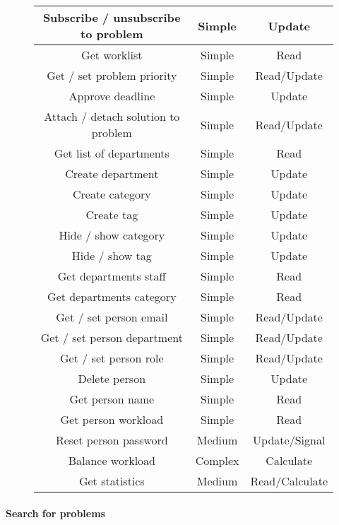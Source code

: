 \begin{figure}[hpt]
\begin{center}
\begin{tabular}{|c|c|c|}
Subscribe / unsubscribe  to problem 	&   Simple & Update   \\ \hline%
Get worklist 								&   Simple & Read   \\ \hline%
Get / set problem priority 	&   Simple & Read/Update   \\ \hline%
Approve deadline 						&   Simple & Update   \\ \hline%
Attach / detach solution to problem	&   Simple & Read/Update   \\ \hline%
Get list of departments 		&   Simple & Read   \\ \hline%
Create department 					&   Simple & Update   \\ \hline%
Create category 						&   Simple & Update   \\ \hline%
Create tag									&   Simple & Update   \\ \hline%
Hide / show category				&   Simple & Update   \\ \hline%
Hide / show tag							&   Simple & Update   \\ \hline%
Get departments staff 			&   Simple & Read   \\ \hline%
Get departments category 	&   Simple & Read   \\ \hline%
Get / set person email 			&   Simple & Read/Update   \\ \hline%
Get / set person department &   Simple & Read/Update   \\ \hline%
Get / set person role 			&   Simple & Read/Update   \\ \hline%
Delete person 							&   Simple & Update   \\ \hline%
Get person name 						&   Simple & Read   \\ \hline%
Get person workload 				&   Simple & Read   \\ \hline%
Reset person password 			&   Medium & Update/Signal   \\ \hline%
Balance workload 						&   Complex & Calculate   \\ \hline%
Get statistics							&   Medium & Read/Calculate   \\ \hline%
\end{tabular}
\end{center}
\label{tab:functionlist}
\end{figure}

\paragraph{Search for problems }

